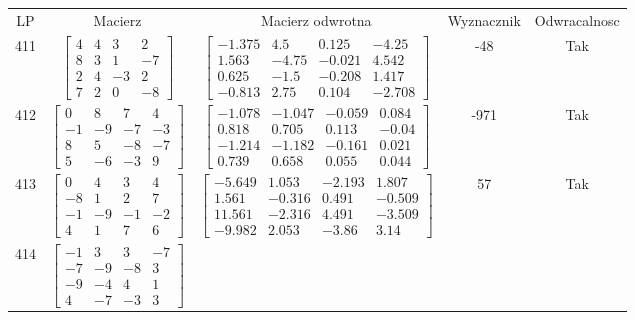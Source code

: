 \documentclass[a4paper,12pt]{article}
\begin{document}
\bgroup {} \vspace{0.2in} \begin{tabular}{c c c c c}
LP & Macierz & Macierz odwrotna & Wyznacznik & Odwracalnosc\\
411
&
$\begin{bmatrix} 4 & 4 & 3 & 2 \\ 8 & 3 & 1 & -7 \\ 2 & 4 & -3 & 2 \\ 7 & 2 & 0 & -8 \end{bmatrix}$
&
$\begin{bmatrix} -1.375 & 4.5 & 0.125 & -4.25 \\ 1.563 & -4.75 & -0.021 & 4.542 \\ 0.625 & -1.5 & -0.208 & 1.417 \\ -0.813 & 2.75 & 0.104 & -2.708 \end{bmatrix}$
&
-48
&
Tak
\\
412
&
$\begin{bmatrix} 0 & 8 & 7 & 4 \\ -1 & -9 & -7 & -3 \\ 8 & 5 & -8 & -7 \\ 5 & -6 & -3 & 9 \end{bmatrix}$
&
$\begin{bmatrix} -1.078 & -1.047 & -0.059 & 0.084 \\ 0.818 & 0.705 & 0.113 & -0.04 \\ -1.214 & -1.182 & -0.161 & 0.021 \\ 0.739 & 0.658 & 0.055 & 0.044 \end{bmatrix}$
&
-971
&
Tak
\\
413
&
$\begin{bmatrix} 0 & 4 & 3 & 4 \\ -8 & 1 & 2 & 7 \\ -1 & -9 & -1 & -2 \\ 4 & 1 & 7 & 6 \end{bmatrix}$
&
$\begin{bmatrix} -5.649 & 1.053 & -2.193 & 1.807 \\ 1.561 & -0.316 & 0.491 & -0.509 \\ 11.561 & -2.316 & 4.491 & -3.509 \\ -9.982 & 2.053 & -3.86 & 3.14 \end{bmatrix}$
&
57
&
Tak
\\
414
&
$\begin{bmatrix} -1 & 3 & 3 & -7 \\ -7 & -9 & -8 & 3 \\ -9 & -4 & 4 & 1 \\ 4 & -7 & -3 & 3 \end{bmatrix}$

\end{tabular}
\end{document}
